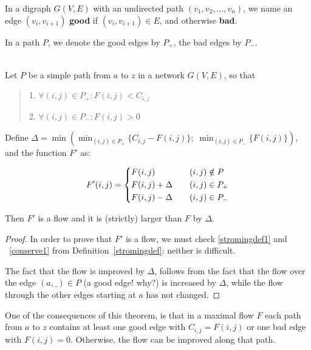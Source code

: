  \begin{definition}
\textup{In a digraph $G(V,E)$ with an undirected path $(v_{1},v_{2},\ldots ,v_{n})$,
we name an edge $(v_{i},v_{i+1})$ \textbf{good} if $(v_{i},v_{i+1})
\in E$, and otherwise \textbf{bad}.}
\end{definition}

In a path $P$, we denote the good edges by $P_{+}$, the bad edges by $P_{-}$.

\begin{theorem}\label{verbeterflow}~\\
Let $P$ be a simple path from $a$ to $z$ in a network $G(V,E)$, so that
\begin{verse}
1. $\forall (i,j) \in P_{+}: F(i,j) < C_{i,j}$

2. $\forall (i,j) \in P_{-}: F(i,j) > 0$
\end{verse}
Define $\Delta = \min\left(\min_{(i,j) \in P_{+}}
\{C_{i,j}-F(i,j)\};\; \min_{(i,j) \in P_{-}} \{F(i,j)\}\right)$, and the
function $F'$ as:

\begin{equation*}
F'(i,j) = \begin{dcases}
		F(i,j)  		   &\quad (i,j) \notin P\\
       F(i,j) + \Delta  &\quad (i,j) \in P_{+}\\
       F(i,j) - \Delta  &\quad (i,j) \in P_{-}
	\end{dcases}
\end{equation*}

Then $F'$ is a flow and it is (strictly) larger than $F$ by $\Delta$.

\end{theorem}
\begin{proof} In order to prove that $F'$ is a flow, we must check
\ref{stromingdef1} and ~\ref{conserve1} from
Definition~\ref{stromingdef}: neither is difficult.

The fact that the flow is improved by $\Delta$, follows from the fact
that the flow over the edge $(a,\_) \in P$ (a good edge! why?) is
increased by $\Delta$, while the flow through the other edges starting
at $a$ has not changed. \end{proof}

One of the consequences of this theorem, is that in a maximal flow $F$
each path from $a$ to $z$ contains at least one good edge with
$C_{i,j} = F(i,j)$ or one bad edge with $F(i,j) = 0$. Otherwise, the
flow can be improved along that path.

